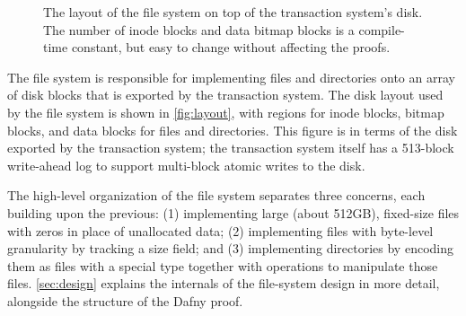 \begin{figure}
  
  \caption{The layout of the file system on top of the transaction system's
    disk. The number of inode blocks and data bitmap blocks is a compile-time
    constant, but easy to change without affecting the proofs.}
  \label{fig:layout}
\end{figure}

The file system is responsible for implementing files and directories
onto an array of disk blocks that is exported by the transaction
system.  The disk layout used by the file system is shown in
\autoref{fig:layout}, with regions for inode blocks, bitmap blocks,
and data blocks for files and directories. This figure is in terms of
the disk exported by the transaction system; the transaction system
itself has a 513-block write-ahead log to support multi-block atomic
writes to the disk.

The high-level organization of the file system separates three concerns, each
building upon the previous: (1) implementing large (about 512GB), fixed-size
files with zeros in place of unallocated data; (2) implementing files with
byte-level granularity by tracking a size field; and (3) implementing
directories by encoding them as files with a special type together with
operations to manipulate those files. \autoref{sec:design} explains the
internals of the file-system design in more detail, alongside the structure of
the Dafny proof.



